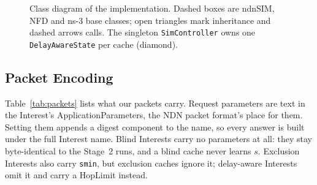 \documentclass[11pt,a4paper]{article}
\newcommand{\code}[1]{\texttt{#1}}
\begin{document}
\begin{figure}[H]
\caption{Class diagram of the implementation. Dashed boxes are ndnSIM, NFD and ns-3 base classes;
open triangles mark inheritance and dashed arrows calls. The singleton \code{SimController} owns
one \code{DelayAwareState} per cache (diamond).}
\label{fig:classes}
\end{figure}

\subsection{Packet Encoding}
Table~\ref{tab:packets} lists what our packets carry. Request parameters are text in the
Interest's ApplicationParameters, the NDN packet format's place for them. Setting them appends a
digest component to the name, so every answer is built under the full Interest name. Blind
Interests carry no parameters at all: they stay byte-identical to the Stage~2 runs, and a blind
cache never learns $s$. Exclusion Interests also carry \code{smin}, but exclusion caches ignore
it; delay-aware Interests omit it and carry a HopLimit instead.
\end{document}
